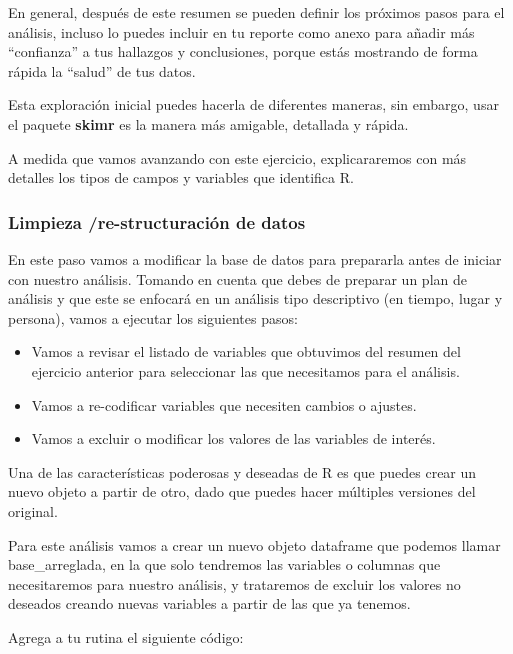 \documentclass[
  letterpaper,
  DIV=11,
  numbers=noendperiod]{scrreprt}
\begin{document}
En general, después de este resumen se pueden definir los próximos pasos
para el análisis, incluso lo puedes incluir en tu reporte como anexo
para añadir más ``confianza'' a tus hallazgos y conclusiones, porque
estás mostrando de forma rápida la ``salud'' de tus datos.

Esta exploración inicial puedes hacerla de diferentes maneras, sin
embargo, usar el paquete \textbf{skimr} es la manera más amigable,
detallada y rápida.

A medida que vamos avanzando con este ejercicio, explicararemos con más
detalles los tipos de campos y variables que identifica R.

\subsubsection{Limpieza /re-structuración de
datos}\label{limpieza-re-structuraciuxf3n-de-datos}

En este paso vamos a modificar la base de datos para prepararla antes de
iniciar con nuestro análisis. Tomando en cuenta que debes de preparar un
plan de análisis y que este se enfocará en un análisis tipo descriptivo
(en tiempo, lugar y persona), vamos a ejecutar los siguientes pasos:

\begin{itemize}
\item
  Vamos a revisar el listado de variables que obtuvimos del resumen del
  ejercicio anterior para seleccionar las que necesitamos para el
  análisis.
\item
  Vamos a re-codificar variables que necesiten cambios o ajustes.
\item
  Vamos a excluir o modificar los valores de las variables de interés.
\end{itemize}

Una de las características poderosas y deseadas de R es que puedes crear
un nuevo objeto a partir de otro, dado que puedes hacer múltiples
versiones del original.

Para este análisis vamos a crear un nuevo objeto dataframe que podemos
llamar base\_arreglada, en la que solo tendremos las variables o
columnas que necesitaremos para nuestro análisis, y trataremos de
excluir los valores no deseados creando nuevas variables a partir de las
que ya tenemos.

Agrega a tu rutina el siguiente código:
\end{document}
